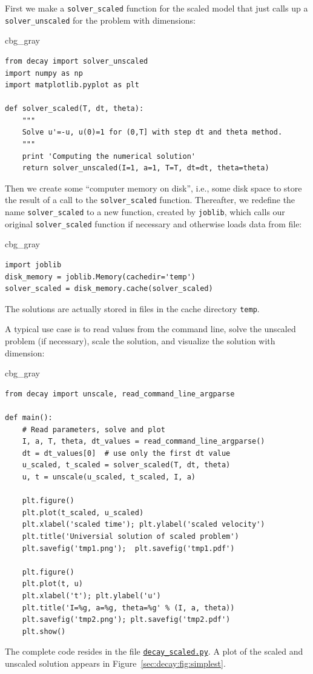\documentclass[graybox,envcountchap,sectrefs,final]{svmonodo}
\newenvironment{_cod_tight}[1]{
   \def\FrameCommand{\colorbox{#1}}
   \FrameRule0.6pt\MakeFramed {\FrameRestore}\vskip3mm}
   {\vskip0mm\endMakeFramed}
\newenvironment{cod}[1]{
\bgroup\rmfamily
\fboxsep=0mm\relax
\begin{_cod_tight}{#1}
\list{}{\parsep=-2mm\parskip=0mm\topsep=0pt\leftmargin=2mm
\rightmargin=2\leftmargin\leftmargin=4pt\relax}
\item\relax}
{\endlist\end{_cod_tight}\egroup}
\begin{document}
First we make a \Verb!solver_scaled! function for the scaled
model that just calls up a \Verb!solver_unscaled! for the problem with
dimensions:

\begin{cod}{cbg_gray}\begin{Verbatim}[numbers=none,fontsize=\fontsize{9pt}{9pt},baselinestretch=0.95,xleftmargin=2mm]
from decay import solver_unscaled
import numpy as np
import matplotlib.pyplot as plt

def solver_scaled(T, dt, theta):
    """
    Solve u'=-u, u(0)=1 for (0,T] with step dt and theta method.
    """
    print 'Computing the numerical solution'
    return solver_unscaled(I=1, a=1, T=T, dt=dt, theta=theta)
\end{Verbatim}
\end{cod}
\noindent
Then we create some ``computer memory on disk'', i.e., some disk space to
store the result of a call to the \Verb!solver_scaled! function. Thereafter,
we redefine the name \Verb!solver_scaled! to a new function, created
by \texttt{joblib}, which calls our original \Verb!solver_scaled! function
if necessary and otherwise loads data from file:

\begin{cod}{cbg_gray}\begin{Verbatim}[numbers=none,fontsize=\fontsize{9pt}{9pt},baselinestretch=0.95,xleftmargin=2mm]
import joblib
disk_memory = joblib.Memory(cachedir='temp')
solver_scaled = disk_memory.cache(solver_scaled)
\end{Verbatim}
\end{cod}
\noindent
The solutions are actually stored in files in the cache directory \texttt{temp}.

A typical use case is to read values from the command line,
solve the unscaled problem (if necessary), scale the solution, and visualize
the solution with dimension:

\begin{cod}{cbg_gray}\begin{Verbatim}[numbers=none,fontsize=\fontsize{9pt}{9pt},baselinestretch=0.95,xleftmargin=2mm]
from decay import unscale, read_command_line_argparse

def main():
    # Read parameters, solve and plot
    I, a, T, theta, dt_values = read_command_line_argparse()
    dt = dt_values[0]  # use only the first dt value
    u_scaled, t_scaled = solver_scaled(T, dt, theta)
    u, t = unscale(u_scaled, t_scaled, I, a)

    plt.figure()
    plt.plot(t_scaled, u_scaled)
    plt.xlabel('scaled time'); plt.ylabel('scaled velocity')
    plt.title('Universial solution of scaled problem')
    plt.savefig('tmp1.png');  plt.savefig('tmp1.pdf')

    plt.figure()
    plt.plot(t, u)
    plt.xlabel('t'); plt.ylabel('u')
    plt.title('I=%g, a=%g, theta=%g' % (I, a, theta))
    plt.savefig('tmp2.png'); plt.savefig('tmp2.pdf')
    plt.show()
\end{Verbatim}
\end{cod}
\noindent
The complete code resides in the file
\href{{http://tinyurl.com/o8pb3yy/decay_scaled.py}}{\nolinkurl{decay_scaled.py}}.
A plot of the scaled and unscaled solution appears in Figure~\ref{sec:decay:fig:simplest}.
\end{document}

